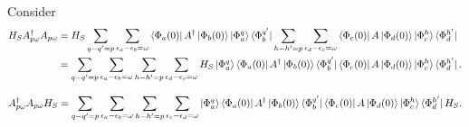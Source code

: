 \documentclass[10pt]{article}
\numberwithin{equation}{section}
\begin{document}
Consider 
\begin{align} \label{eq:21}
H_{S}A_{p\omega}^{\dagger}A_{p\omega} &= H_{S} \sum_{q-q' = p} \sum_{\epsilon_{a}-\epsilon_{b} = \omega}  \bra{\Phi_{a}(0)}A^{\dagger}\ket{\Phi_{b}(0)}\ket{\Phi_{a}^{q}}\bra{\Phi_{b}^{q'}} \sum_{h-h' = p} \sum_{\epsilon_{d}-\epsilon_{c} = \omega}  \bra{\Phi_{c}(0)}A\ket{\Phi_{d}(0)}\ket{\Phi_{c}^{h}}\bra{\Phi_{d}^{h'}} \\
							         &= \sum_{q-q' = p} \sum_{\epsilon_{a}-\epsilon_{b} = \omega}  \sum_{h-h' = p} \sum_{\epsilon_{d}-\epsilon_{c} = \omega}  H_{S}\ket{\Phi_{a}^{q}}  \bra{\Phi_{a}(0)}A^{\dagger}\ket{\Phi_{b}(0)}\bra{\Phi_{b}^{q'}}\bra{\Phi_{c}(0)}A\ket{\Phi_{d}(0)}\ket{\Phi_{c}^{h}}\bra{\Phi_{d}^{h'}}.
\end{align}

\begin{equation} \label{eq:22}
A_{p\omega}^{\dagger}A_{p\omega}H_{S} = \sum_{q-q' = p} \sum_{\epsilon_{a}-\epsilon_{b} = \omega}  \sum_{h-h' = p} \sum_{\epsilon_{c}-\epsilon_{d} = \omega}  \ket{\Phi_{a}^{q}}  \bra{\Phi_{a}(0)}A^{\dagger}\ket{\Phi_{b}(0)}\bra{\Phi_{b}^{q'}}\bra{\Phi_{c}(0)}A\ket{\Phi_{d}(0)}\ket{\Phi_{c}^{h}}\bra{\Phi_{d}^{h'}}H_{S}.
\end{equation}
\end{document}
